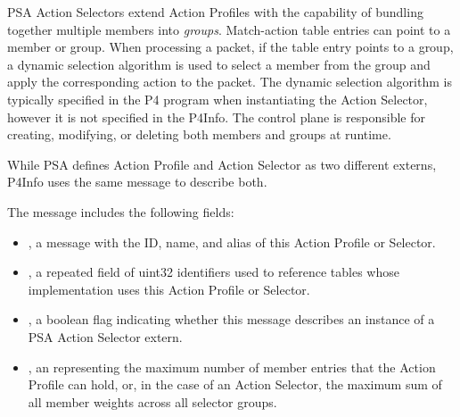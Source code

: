 \documentclass[11pt]{article}
\begin{document}
{%
PSA Action Selectors extend Action Profiles with the capability of bundling
together multiple members into \emph{groups}. Match-action table entries can point to
a member or group. When processing a packet, if the table entry points to a
group, a dynamic selection algorithm is used to select a member from the group
and apply the corresponding action to the packet. The dynamic selection
algorithm is typically specified in the P4 program when instantiating the Action
Selector, however it is not specified in the P4Info. The control plane is
responsible for creating, modifying, or deleting both members and groups at
runtime.%

While PSA defines Action Profile and Action Selector as two different externs,
P4Info uses the same  message to describe both.%

The  message includes the following fields:%

\begin{itemize}%

\item{}
, a  message with the ID, name, and alias of this Action
Profile or Selector.%

\item{}
, a repeated field of uint32 identifiers used to reference tables
whose implementation uses this Action Profile or Selector.%

\item{}
, a boolean flag indicating whether this message describes an
instance of a PSA Action Selector extern.%

\item{}
, an  representing the maximum number of member entries that the
Action Profile can hold, or, in the case of an Action Selector, the maximum
sum of all member weights across all selector groups.%


\end{itemize}}
\end{document}
